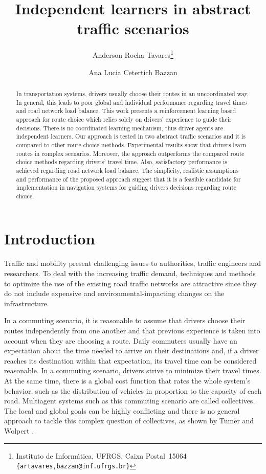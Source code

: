 \documentclass{RITA}
\title{Independent learners in abstract traffic scenarios}
\author{
  Anderson Rocha Tavares\footnote{Instituto de Inform\'atica, UFRGS, Caixa Postal~15064\\
  \texttt{\{artavares,bazzan@inf.ufrgs.br\}}}
  \and Ana Lucia Cetertich Bazzan\footnotemark[1]
}
\begin{document}
\maketitle

\begin{abstract}
In transportation systems, drivers usually choose their routes in an uncoordinated way. In general, this leads to poor global and individual performance regarding travel times and road network load balance. This work presents a reinforcement learning based approach for route choice which relies solely on drivers' experience to guide their decisions. 
There is no coordinated learning mechanism, thus driver agents are independent learners. Our approach is tested in two abstract traffic scenarios and it is compared to other route choice methods. 
Experimental results show that drivers learn routes in complex scenarios. Moreover, the approach outperforms the compared route choice methods regarding drivers' travel time. Also, satisfactory performance is achieved regarding road network load balance. 
The simplicity, realistic assumptions and performance of the proposed approach suggest that it is a feasible candidate for implementation in navigation systems for guiding drivers decisions regarding route choice.
\end{abstract}




\section{Introduction}
\label{sec:intro}

Traffic and mobility present challenging issues to authorities, traffic engineers and researchers. To deal with the increasing traffic demand, techniques and methods to optimize the use of the existing road traffic networks are attractive since they do not include expensive and environmental-impacting changes on the infrastructure.

In a commuting scenario, it is reasonable to assume that drivers choose their routes independently from one another and that previous experience is taken into account when they are choosing a route. Daily commuters usually have an expectation about the time needed to arrive on their destinations and, if a driver reaches its destination within that expectation, its travel time can be considered  reasonable. In a commuting scenario, drivers strive to minimize their travel times. At the same time, there is a global cost function that rates the whole system's behavior, such as the distribution of vehicles in proportion to the capacity of each road. Multiagent systems such as this commuting scenario are called collectives. The local and global goals can be highly conflicting and there is no general approach to tackle this complex question of collectives, as shown by Tumer and Wolpert \cite{Tumer&Wolpert2004}.
\end{document}
